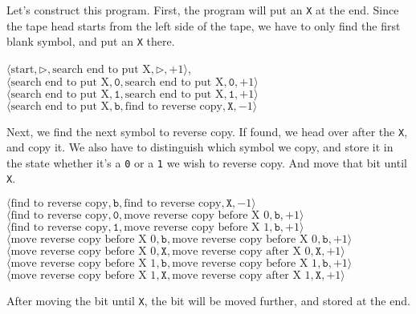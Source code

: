 \documentclass[a4paper,12pt]{article}
\newcommand{\la}{\langle}
\newcommand{\ra}{\rangle}
\begin{document}
    Let's construct this program. First, the program will put an \texttt{X} at the end. Since the tape head starts from the left side of the tape, we have to only find the first blank symbol, and put an \texttt{X} there.
    \begin{center}
        $\la \textrm{start}, \triangleright, \textrm{search end to put X}, \triangleright, +1 \ra$, \\
        $\la \textrm{search end to put X}, \texttt{0}, \textrm{search end to put X}, \texttt{0}, +1 \ra$\\
        $\la \textrm{search end to put X}, \texttt{1}, \textrm{search end to put X}, \texttt{1}, +1 \ra$\\
        $\la \textrm{search end to put X}, \texttt{b}, \textrm{find to reverse copy}, \texttt{X}, -1 \ra$\\
    \end{center}
    Next, we find the next symbol to reverse copy. If found, we head over after the \texttt{X}, and copy it. We also have to distinguish which symbol we copy, and store it in the state whether it's a \texttt{0} or a \texttt{1} we wish to reverse copy. And move that bit until \texttt{X}.
    \begin{center}
        $\la \textrm{find to reverse copy}, \texttt{b}, \textrm{find to reverse copy}, \texttt{X}, -1 \ra$\\
        $\la \textrm{find to reverse copy}, \texttt{0}, \textrm{move reverse copy before X 0}, \texttt{b}, +1 \ra$\\
        $\la \textrm{find to reverse copy}, \texttt{1}, \textrm{move reverse copy before X 1}, \texttt{b}, +1 \ra$\\
        $\la \textrm{move reverse copy before X 0}, \texttt{b}, \textrm{move reverse copy before X 0}, \texttt{b}, +1 \ra$\\
        $\la \textrm{move reverse copy before X 0}, \texttt{X}, \textrm{move reverse copy after X 0}, \texttt{X}, +1 \ra$\\
        $\la \textrm{move reverse copy before X 1}, \texttt{b}, \textrm{move reverse copy before X 1}, \texttt{b}, +1 \ra$\\
        $\la \textrm{move reverse copy before X 1}, \texttt{X}, \textrm{move reverse copy after X 1}, \texttt{X}, +1 \ra$\\
    \end{center}
    After moving the bit until \texttt{X}, the bit will be moved further, and stored at the end.
\end{document}
